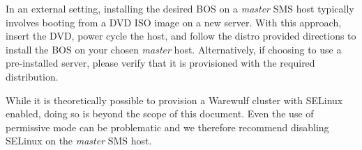 In an external setting, installing the desired BOS on a {\em master} SMS host
typically involves booting from a DVD ISO image on a new server. With this
approach, insert the \baseOS{} DVD, power cycle the host, and follow the distro
provided directions to install the BOS on your chosen {\em master} host.
Alternatively, if choosing to use a pre-installed server, please verify that it
is provisioned with the required \baseOS{} distribution.

\begin{center}
\begin{tcolorbox}[]
\small
While it is theoretically possible to provision a Warewulf cluster with SELinux
enabled, doing so is beyond the scope of this document. Even the use of
permissive mode can be problematic and we therefore recommend disabling SELinux on the {\em
master} SMS host.

\end{tcolorbox}
\end{center}
